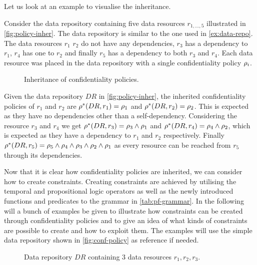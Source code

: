 Let us look at an example to visualise the inheritance.
\begin{example}
Consider the data repository containing five data resources $r_{1,\ldots,5}$ illustrated in \autoref{fig:policy-inher}. The data repository is similar to the one used in \autoref{ex:data-repo}. The data resources $r_1$ $r_2$ do not have any dependencies, $r_3$ has a dependency to $r_1$, $r_4$ has one to $r_2$ and finally $r_5$ has a dependency to both $r_3$ and $r_4$. Each data resource was placed in the data repository with a single confidentiality policy $\rho_i$.
\begin{figure}[!ht]
    \begin{center}
        
        \caption{Inheritance of confidentiality policies.}
        \label{fig:policy-inher}
    \end{center}
\end{figure}
Given the data repository $DR$ in \autoref{fig:policy-inher}, the inherited confidentiality policies of $r_1$ and $r_2$ are $\rho^{\ast}(DR, r_1) = \rho_1$ and $\rho^{\ast}(DR, r_2) = \rho_2$. This is expected as they have no dependencies other than a self-dependency. Considering the resource $r_3$ and $r_4$ we get $\rho^{\ast}(DR, r_3) = \rho_3 \land \rho_1$ and $\rho^{\ast}(DR, r_4) = \rho_4 \land \rho_2$, which is expected as they have a dependency to $r_1$ and $r_2$ respectively. Finally $\rho^{\ast}(DR, r_5) = \rho_5 \land \rho_4 \land \rho_3 \land \rho_2 \land \rho_1$ as every resource can be reached from $r_5$ through its dependencies.
\end{example}

Now that it is clear how confidentiality policies are inherited, we can consider how to create constraints. Creating constraints are achieved by utilising the temporal and propositional logic operators as well as the newly introduced functions and predicates to the grammar in \autoref{tab:pf-grammar}. In the following will a bunch of examples be given to illustrate how constraints can be created through confidentiality policies and to give an idea of what kinds of constraints are possible to create and how to exploit them. The examples will use the simple data repository shown in \autoref{fig:conf-policy} as reference if needed.

\begin{figure}[!ht]
    \begin{center}
        
        \caption{Data repository $DR$ containing 3 data resources $r_1, r_2, r_3$.}
        \label{fig:conf-policy}
    \end{center}
\end{figure}

